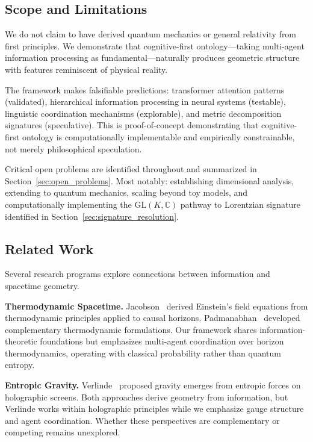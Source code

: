 \documentclass[11pt]{article}
\begin{document}
\subsection{Scope and Limitations}

We do not claim to have derived quantum mechanics or general relativity from first principles. We demonstrate that cognitive-first ontology---taking multi-agent information processing as fundamental---naturally produces geometric structure with features reminiscent of physical reality.

The framework makes falsifiable predictions: transformer attention patterns (validated), hierarchical information processing in neural systems (testable), linguistic coordination mechanisms (explorable), and metric decomposition signatures (speculative). This is proof-of-concept demonstrating that cognitive-first ontology is computationally implementable and empirically constrainable, not merely philosophical speculation.

Critical open problems are identified throughout and summarized in Section~\ref{sec:open_problems}. Most notably: establishing dimensional analysis, extending to quantum mechanics, scaling beyond toy models, and computationally implementing the $\mathrm{GL}(K, \mathbb{C})$ pathway to Lorentzian signature identified in Section~\ref{sec:signature_resolution}.

\subsection{Related Work}

Several research programs explore connections between information and spacetime geometry.

\textbf{Thermodynamic Spacetime.} Jacobson~\cite{Jacobson1995} derived Einstein's field equations from thermodynamic principles applied to causal horizons. Padmanabhan~\cite{Padmanabhan2010} developed complementary thermodynamic formulations. Our framework shares information-theoretic foundations but emphasizes multi-agent coordination over horizon thermodynamics, operating with classical probability rather than quantum entropy.

\textbf{Entropic Gravity.} Verlinde~\cite{Verlinde2011} proposed gravity emerges from entropic forces on holographic screens. Both approaches derive geometry from information, but Verlinde works within holographic principles while we emphasize gauge structure and agent coordination. Whether these perspectives are complementary or competing remains unexplored.
\end{document}
